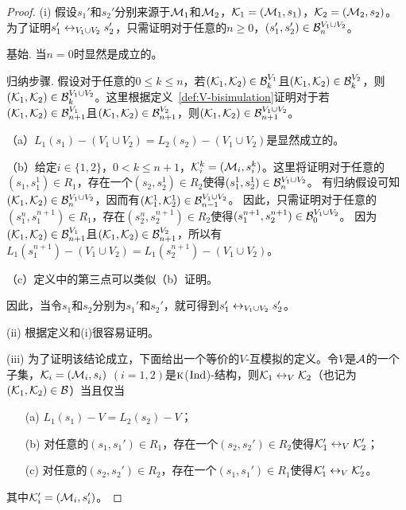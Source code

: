 \begin{proof}
	(i) 假设$s_1'$和$s_2'$分别来源于${\cal M}_1$和${\cal M}_2$，${\cal K}_1=({\cal M}_1,s_1)$，${\cal K}_2=({\cal M}_2,s_2)$。为了证明$s_1'\leftrightarrow_{V_1 \cup V_2} s_2'$，只需证明对于任意的$n\ge 0$，$(s_1',s_2')\in {\cal B}_n^{V_1 \cup V_2}$。
	
	基始. 当$n=0$时显然是成立的。
	
	归纳步骤. 假设对于任意的$0\leq k \leq n$，若$({\cal K}_1, {\cal K}_2) \in {\cal B}_k^{V_1}$且$({\cal K}_1, {\cal K}_2) \in {\cal B}_k^{V_2}$，则$({\cal K}_1, {\cal K}_2) \in {\cal B}_k^{V_1\cup V_2}$。这里根据定义~\ref{def:V-bisimulation}证明对于若$({\cal K}_1, {\cal K}_2) \in {\cal B}_{n+1}^{V_1}$且$({\cal K}_1, {\cal K}_2) \in {\cal B}_{n+1}^{V_2}$，则$({\cal K}_1, {\cal K}_2) \in {\cal B}_{n+1}^{V_1\cup V_2}$。
	
	（a）$L_1(s_1)-(V_1\cup V_2) = L_2(s_2) - (V_1 \cup V_2)$是显然成立的。
	
	（b）给定$i\in \{1,2\}$，$0< k \leq n+1$，${\cal K}_i^k=({\cal M}_i, s_i^k)$。这里将证明对于任意的$(s_1,s_1^1)\in R_1$，存在一个$(s_2,s_2^1)\in R_2$使得$(s_1^1,s_2^1)\in {\cal B}_n^{V_1\cup V_2}$。
	有归纳假设可知$({\cal K}_1,{\cal K}_2)\in {\cal B}_n^{V_1\cup V_2}$，因而有$({\cal K}_1^1, {\cal K}_2^1) \in {\cal B}_{n-1}^{V_1 \cup V_2}$。
	因此，只需证明对于任意的$(s_1^n,s_1^{n+1})\in R_1$，存在$(s_2^n,s_2^{n+1}) \in R_2$使得$(s_1^{n+1},s_2^{n+1})\in {\cal B}_0^{V_1\cup V_2}$。
	因为$({\cal K}_1,{\cal K}_2)\in {\cal B}_{n+1}^{V_1}$且$({\cal K}_1,{\cal K}_2)\in {\cal B}_{n+1}^{V_2}$，所以有$L_1(s_1^{n+1}) - (V_1 \cup V_2) = L_1(s_2^{n+1}) - (V_1 \cup V_2)$。
	
	（c）定义中的第三点可以类似（b）证明。
	
	因此，当令$s_1$和$s_2$分别为$s_1'$和$s_2'$，就可得到$s_1'\leftrightarrow_{V_1 \cup V_2} s_2'$。
	
	(ii) 根据定义和(i)很容易证明。
	
	(iii) 为了证明该结论成立，下面给出一个等价的$V$-互模拟的定义。令$V$是${\cal A}$的一个子集，${\cal K}_i=({\cal M}_i, s_i)$ $(i=1,2)$是$\textsc{k}$($\textrm{Ind}$)-结构，则${\cal K}_1\leftrightarrow_V {\cal K}_2$（也记为$({\cal K}_1,{\cal K}_2) \in {\cal B}$）当且仅当
	\begin{itemize}
		\item[(a)] $L_1(s_1)-V = L_2(s_2)-V$；
		\item[(b)] 对任意的$(s_1,s_1')\in R_1$，存在一个$(s_2,s_2')\in R_2$使得${\cal K}_1' \leftrightarrow_V {\cal K}_2'$；
		\item[(c)] 对任意的$(s_2,s_2')\in R_2$，存在一个$(s_1,s_1')\in R_1$使得${\cal K}_1' \leftrightarrow_V {\cal K}_2'$。
	\end{itemize}
	其中${\cal K}_i'=({\cal M}_i, s_i')$。


\end{proof}

